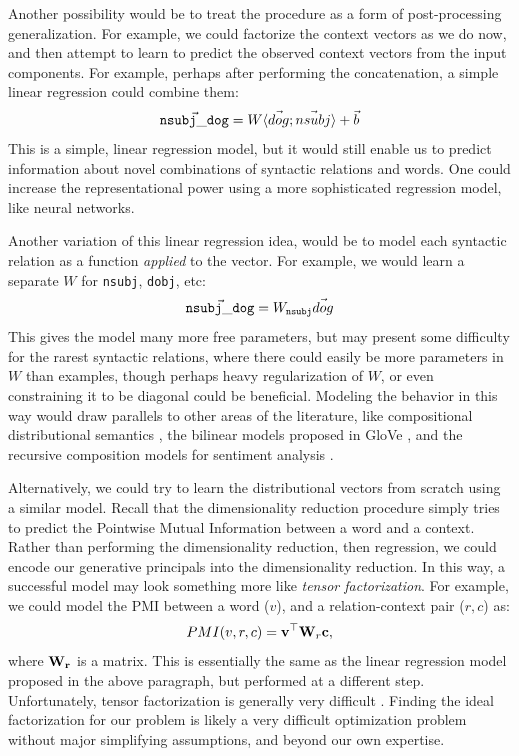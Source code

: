 \documentclass[12pt]{article}
\begin{document}
Another possibility would be to treat the procedure as a form of post-processing
generalization. For example, we could factorize the context vectors as we do now, and
then attempt to learn to predict the observed context vectors from the input
components. For example, perhaps after performing the concatenation, a simple
linear regression could combine them:
\begin{equation*}
  \vec{ {\tt nsubj\_dog} } = W\langle \vec{dog} ; \vec{nsubj} \rangle + \vec{b}
\end{equation*}
This is a simple, linear regression model, but it would still enable us to
predict information about novel combinations of syntactic relations and words.
One could increase the representational power using a more sophisticated
regression model, like neural networks.

Another variation of this linear regression idea, would be to model each
syntactic relation as a function {\em applied} to the vector. For example,
we would learn a separate $W$ for {\tt nsubj}, {\tt dobj}, etc:
\begin{equation*}
  \vec{ {\tt nsubj\_dog} } = W_{{\tt nsubj}}\vec{dog}
\end{equation*}
This gives the model many more free parameters, but may present some difficulty
for the rarest syntactic relations, where there could easily be more parameters
in $W$ than examples, though perhaps heavy regularization of $W$, or even
constraining it to be diagonal could be beneficial. Modeling the behavior in
this way would draw parallels to other areas of the literature,
like compositional distributional semantics \cite{baroni:2010:emnlp,coecke:2011:la,grefenstette:2011:emnlp,baroni:2014:li}, the
bilinear models proposed in GloVe \cite{pennington:2014:emnlp}, and the recursive
composition models for sentiment analysis \cite{socher:2013:emnlp}.

Alternatively, we could  try to learn the distributional vectors from scratch
using a similar model. Recall that the dimensionality reduction procedure
simply tries to predict the Pointwise Mutual Information between a word and
a context. Rather than performing the dimensionality reduction, then regression,
we could encode our generative principals into the dimensionality reduction.
In this way, a successful model may look something more like {\em tensor
factorization}. For example, we could model the PMI between a word ($v$),
and a relation-context pair ($r, c$) as:
\begin{equation*}
  PMI(v, r, c) = {\bf v}^\top {\bf W}_{r} {\bf c},
\end{equation*}
where ${\bf W_r}$ is a matrix. This is essentially the same as the linear
regression model proposed in the above paragraph, but performed at a different
step. Unfortunately, tensor factorization is generally very difficult
\cite{haastad:1990:ja,hillar:2013:jacm}. Finding the ideal
factorization for our problem is likely a very difficult optimization problem
without major simplifying assumptions, and beyond our own expertise.
\end{document}
